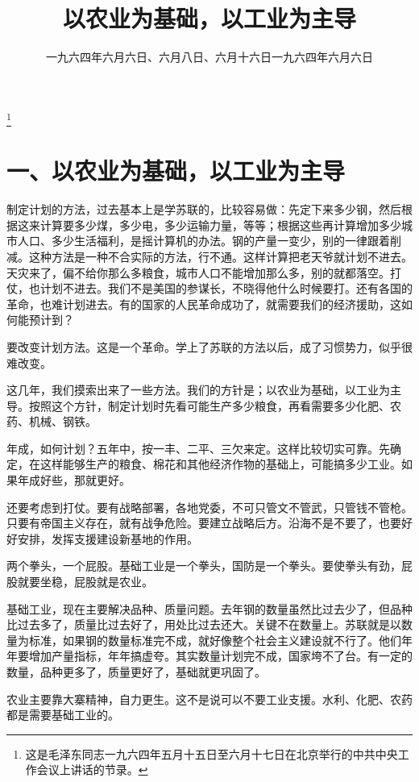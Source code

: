
\title{以农业为基础，以工业为主导}
\date{一九六四年六月六日、六月八日、六月十六日}
\thanks{这是毛泽东同志一九六四年五月十五日至六月十七日在北京举行的中共中央工作会议上讲话的节录。}
\maketitle


\date{一九六四年六月六日}
\section{一、以农业为基础，以工业为主导}

制定计划的方法，过去基本上是学苏联的，比较容易做：先定下来多少钢，然后根据这来计算要多少煤，多少电，多少运输力量，等等；根据这些再计算增加多少城市人口、多少生活福利，是摇计算机的办法。钢的产量一变少，别的一律跟着削减。这种方法是一种不合实际的方法，行不通。这样计算把老天爷就计划不进去。天灾来了，偏不给你那么多粮食，城市人口不能增加那么多，别的就都落空。打仗，也计划不进去。我们不是美国的参谋长，不晓得他什么时候要打。还有各国的革命，也难计划进去。有的国家的人民革命成功了，就需要我们的经济援助，这如何能预计到？

要改变计划方法。这是一个革命。学上了苏联的方法以后，成了习惯势力，似乎很难改变。

这几年，我们摸索出来了一些方法。我们的方针是；以农业为基础，以工业为主导。按照这个方针，制定计划时先看可能生产多少粮食，再看需要多少化肥、农药、机械、钢铁。

年成，如何计划？五年中，按一丰、二平、三欠来定。这样比较切实可靠。先确定，在这样能够生产的粮食、棉花和其他经济作物的基础上，可能搞多少工业。如果年成好些，那就更好。

还要考虑到打仗。要有战略部署，各地党委，不可只管文不管武，只管钱不管枪。只要有帝国主义存在，就有战争危险。要建立战略后方。沿海不是不要了，也要好好安排，发挥支援建设新基地的作用。

两个拳头，一个屁股。基础工业是一个拳头，国防是一个拳头。要使拳头有劲，屁股就要坐稳，屁股就是农业。

基础工业，现在主要解决品种、质量问题。去年钢的数量虽然比过去少了，但品种比过去多了，质量比过去好了，用处比过去还大。关键不在数量上。苏联就是以数量为标准，如果钢的数量标准完不成，就好像整个社会主义建设就不行了。他们年年要增加产量指标，年年搞虚夸。其实数量计划完不成，国家垮不了台。有一定的数量，品种更多了，质量更好了，基础就更巩固了。

农业主要靠大寨精神，自力更生。这不是说可以不要工业支援。水利、化肥、农药都是需要基础工业的。


